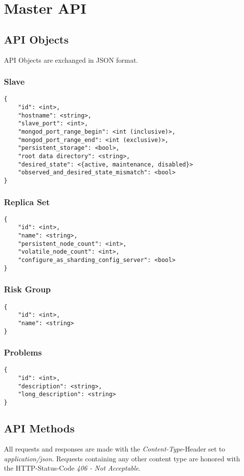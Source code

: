 \section{Master API}
\subsection{API Objects}
API Objects are exchanged in JSON format.
\subsubsection{Slave}
\begin{lstlisting}
{
	"id": <int>,
	"hostname": <string>,
	"slave_port": <int>,
	"mongod_port_range_begin": <int (inclusive)>,
	"mongod_port_range_end": <int (exclusive)>,
	"persistent_storage": <bool>,
	"root data directory": <string>,
	"desired_state": <{active, maintenance, disabled}>
	"observed_and_desired_state_mismatch": <bool>
}
\end{lstlisting}
\subsubsection{Replica Set}
\begin{lstlisting}
{
	"id": <int>,
	"name": <string>,
	"persistent_node_count": <int>,
	"volatile_node_count": <int>,
	"configure_as_sharding_config_server": <bool>
}
\end{lstlisting}
\subsubsection{Risk Group}
\begin{lstlisting}
{
	"id": <int>,
	"name": <string>
}
\end{lstlisting}
\subsubsection{Problems}
\begin{lstlisting}
{
	"id": <int>,
	"description": <string>,
	"long_description": <string>
}
\end{lstlisting}
\subsection{API Methods}
All requests and responses are made with the \emph{Content-Type}-Header set to \emph{application/json}. Requests containing any other content type are honored with the HTTP-Status-Code \emph{406 - Not Acceptable}.
